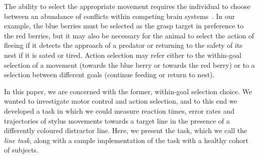 \documentclass[10pt,letterpaper]{article}
\begin{document}
The
ability to select the appropriate movement requires the individual to
choose between an abundance of conflicts within competing brain
systems~\cite{redgrave_basal_1999}. In our example, the blue berries
must be selected as the grasp target in preference to the red berries,
but it may also be necessary for the animal to select the action of
fleeing if it detects the approach of a predator or returning to the
safety of its nest if it is sated or tired. Action selection may refer
either to the within-goal selection of a movement (towards the blue
berry or towards the red berry) or to a selection between different
goals (continue feeding or return to nest).

In this paper, we are concerned with the former, within-goal selection
choice. We wanted to investigate motor control and action selection,
and to this end we developed a task in which we could measure reaction
times, error rates and trajectories of stylus movements towards a
target line in the presence of a differently coloured distractor
line. Here, we present the task, which we call the \emph{line task},
along with a sample implementation of the task with a healthy cohort
of subjects.
\end{document}
